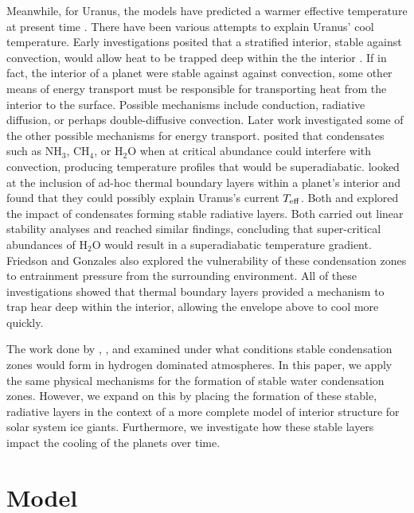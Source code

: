 \documentclass[11pt]{ucscthesisbs}
\begin{document}
Meanwhile, for Uranus, the models have predicted a warmer effective temperature at present time \citep{fortney_2011, podolak_1991, hubbard_1995, scheibe_2019}. There have been various attempts to explain Uranus' cool temperature. Early investigations posited that a stratified interior, stable against convection, would allow heat to be trapped deep within the the interior \citep{podolak_1991}. If in fact, the interior of a planet were stable against against convection, some other means of energy transport must be responsible for transporting heat from the interior to the surface. Possible mechanisms include conduction, radiative diffusion, or perhaps double-diffusive convection. Later work investigated some of the other possible mechanisms for energy transport. \citep{guillot_1995} posited that condensates such as NH$_{3}$, CH$_{4}$, or H$_{2}$O when at critical abundance could interfere with convection, producing temperature profiles that would be superadiabatic. \citep{nettelmann_2016} looked at the inclusion of ad-hoc thermal boundary layers within a planet's interior and found that they could possibly explain Uranus's current $T_{\rm eff}$. Both \citep{friedson_2017} and \citep{leconte_2017} explored the impact of condensates forming stable radiative layers. Both carried out linear stability analyses and reached similar findings, concluding that super-critical abundances of H$_{2}$O would result in a superadiabatic temperature gradient. Friedson and Gonzales also explored the vulnerability of these condensation zones to entrainment pressure from the surrounding environment. All of these investigations showed that thermal boundary layers provided a mechanism to trap hear deep within the interior, allowing the envelope above to cool more quickly.

The work done by \citep{guillot_1995}, \citep{friedson_2017}, and \citep{leconte_2017} examined under what conditions stable condensation zones would form in hydrogen dominated atmospheres. In this paper, we apply the same physical mechanisms for the formation of stable water condensation zones. However, we expand on this by placing the formation of these stable, radiative layers in the context of a more complete model of interior structure for solar system ice giants. Furthermore, we investigate how these stable layers impact the cooling of the planets over time. 

\chapter{Model}
\end{document}
